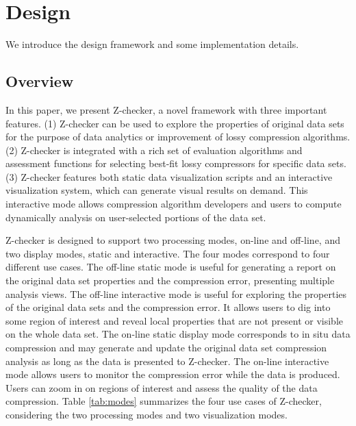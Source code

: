 \section{Design}

We introduce the design framework and some implementation details.

\subsection{Overview}
In this paper, we present Z-checker, a novel framework with three important features. (1) Z-checker can be used to explore the properties of original data sets for the purpose of data analytics or improvement of lossy compression algorithms. (2) Z-checker is integrated with a rich set of evaluation algorithms and assessment functions for selecting best-fit lossy compressors for specific data sets. (3) Z-checker features both static data visualization scripts and an interactive visualization system, which can generate visual results on demand. This interactive mode allows compression algorithm developers and users to compute dynamically analysis on user-selected portions of the data set.

Z-checker is designed to support two processing modes, on-line and off-line, and two display modes, static and interactive. The four modes correspond to four different use cases. The off-line static mode is useful for generating a report on the original data set properties and the compression error, presenting multiple analysis views. The off-line interactive mode is useful for exploring the properties of the original data sets and the compression error. It allows users to dig into some region of interest and reveal local properties that are not present or visible on the whole data set. The on-line static display mode corresponds to in situ data compression and may generate and update the original data set compression analysis as long as the data is presented to Z-checker. The on-line interactive mode allows users to monitor the compression error while the data is produced. Users can zoom in on regions of interest and assess the quality of the data compression. Table \ref{tab:modes} summarizes the four use cases of Z-checker, considering the two processing modes and two visualization modes.

